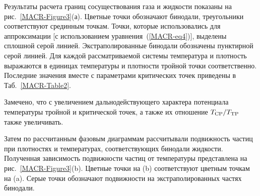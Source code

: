 Результаты расчета границ сосуществования газа и жидкости показаны на рис.~\ref{MACR-Figure3}(а).
Цветные точки обозначают бинодали, треугольники соответствуют срединным точкам.
Точки, которые использовались для аппроксимации [с использованием уравнения~(\ref{MACR-eq4})], выделены сплошной серой линией.
Экстраполированные бинодали обозначены пунктирной серой линией.
Для каждой рассматриваемой системы температура и плотность выражаются в единицах температуры и плотности тройной точки соответственно.
Последние значения вместе с параметрами критических точек приведены в Таб.~\ref{MACR-Table2}.

\begin{table}[h!]
    \caption{Значения плотностей и температур критических и тройных точек и параметры аппроксимации по уравнению~\eqref{MACR-eq4} для рассматриваемых моделей.
     Для обобщенных систем LJ температуры и плотности даны в сокращенных единицах. Для этана температура выражена в К, а плотность выражена в $\text{кг}/\text{м}^3$. Параметры критической и тройной точек для этана взяты из работы~\cite{10.1063/1.555785}.}
    \label{MACR-Table2}
\end{table}

Замечено, что с увеличением дальнодействующего характера потенциала температуры тройной и критической точек, а также их отношение $T_{\rm CP}/T_{\rm TP}$ также увеличивать.

Затем по рассчитанным фазовым диаграммам рассчитывали подвижность частиц при плотностях и температурах, соответствующих бинодали жидкости. Полученная зависимость подвижности частиц от температуры представлена на рис.~\ref{MACR-Figure3}(b). Цветные точки на (b) соответствуют цветным точкам на (a). Серые точки обозначают подвижности на экстраполированных частях бинодали.

